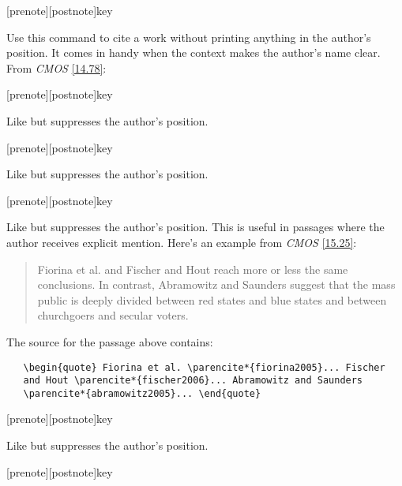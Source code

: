\documentclass[11pt,letterpaper,oneside]{article}
\begin{document}
\begin{ltxsyntax}

[prenote][postnote]{key}

Use this command to cite a work without printing anything in the
author's position. It comes in handy when the context makes the
author's name clear. From \textit{CMOS} \ref{14.78}:

\begin{citebib}
\item \cite*[233]{franklin1868}
\item \cite*[234]{franklin1868}
\end{citebib}

[prenote][postnote]{key}

Like  but suppresses the author's position.

[prenote][postnote]{key}

Like  but suppresses the author's position.

[prenote][postnote]{key}

Like  but suppresses the author's position. This is
useful in passages where the author receives explicit mention. Here's
an example from \textit{CMOS} \ref{15.25}:

\begin{quote} Fiorina et al. \parencite*{fiorina2005} and Fischer and
Hout \parencite*{fischer2006} reach more or less the same conclusions.
In contrast, Abramowitz and Saunders \parencite*{abramowitz2005}
suggest that the mass public is deeply divided between red states and
blue states and between churchgoers and secular voters. \end{quote}

The source for the passage above contains:

\begin{verbatim}
   \begin{quote} Fiorina et al. \parencite*{fiorina2005}... Fischer
   and Hout \parencite*{fischer2006}... Abramowitz and Saunders
   \parencite*{abramowitz2005}... \end{quote}
\end{verbatim}

[prenote][postnote]{key}

Like  but suppresses the author's position.

[prenote][postnote]{key}


\end{ltxsyntax}
\end{document}
